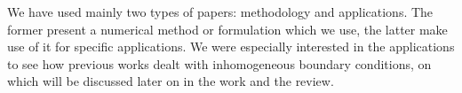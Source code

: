 



We have used mainly two types of papers: 
methodology and applications.
The former present a numerical method or formulation 
which we use, 
the latter make use of it for specific applications.
We were especially interested in the applications to see how
previous works dealt with inhomogeneous boundary conditions,
on which will be discussed later on in the work and the review.

